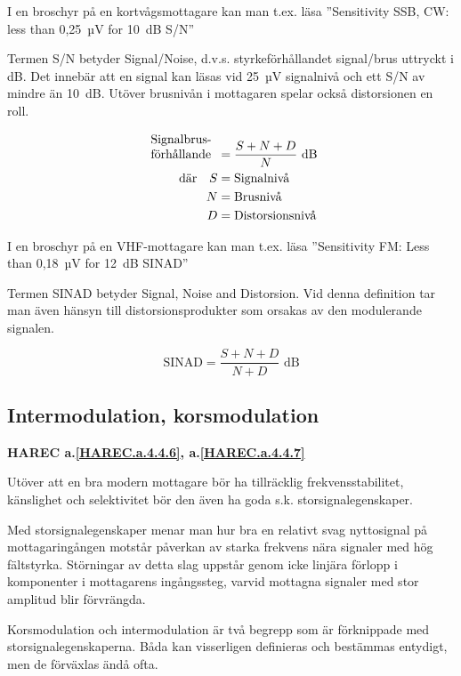 I en broschyr på en kortvågsmottagare kan man t.ex. läsa
''Sensitivity SSB, CW: less than 0,25~µV for 10~dB S/N''

Termen S/N betyder Signal/Noise, d.v.s. styrkeförhållandet signal/brus
uttryckt i dB. Det innebär att en signal kan läsas vid 25~µV signalnivå
och ett S/N av mindre än 10~dB.
Utöver brusnivån i mottagaren spelar också distorsionen en roll.

\begin{align*}
  \begin{array}[b]{l}
    \text{Signalbrus-} \\
    \text{förhållande}
  \end{array} &= \frac{S + N + D}{N} \text{ dB} \\
  \text{där} \quad S &= \text{Signalnivå} \\
  N &= \text{Brusnivå} \\
  D &= \text{Distorsionsnivå} \\
\end{align*}

I en broschyr på en VHF-mottagare kan man t.ex. läsa
''Sensitivity FM: Less than 0,18~µV for 12~dB SINAD''

Termen SINAD betyder Signal, Noise and Distorsion. Vid denna
definition tar man även hänsyn till distorsionsprodukter som orsakas
av den modulerande signalen. 

\[
\text{SINAD} = \frac{S+N+D}{N+D}\text{ dB}
\]

\subsection{Intermodulation, korsmodulation}
\textbf{HAREC
  a.\ref{HAREC.a.4.4.6}\label{myHAREC.a.4.4.6},
  a.\ref{HAREC.a.4.4.7}\label{myHAREC.a.4.4.7}
}

Utöver att en bra modern mottagare bör ha tillräcklig
frekvensstabilitet, känslighet och selektivitet bör den även ha goda
s.k. storsignalegenskaper.

Med storsignalegenskaper menar man hur bra en relativt svag
nyttosignal på mottagaringången motstår påverkan av starka
frekvens nära signaler med hög fältstyrka. Störningar av detta slag
uppstår genom icke linjära förlopp i komponenter i mottagarens
ingångssteg, varvid mottagna signaler med stor amplitud blir
förvrängda.

Korsmodulation och intermodulation är två begrepp som är förknippade
med storsignalegenskaperna. Båda kan visserligen definieras och
bestämmas entydigt, men de förväxlas ändå ofta.

